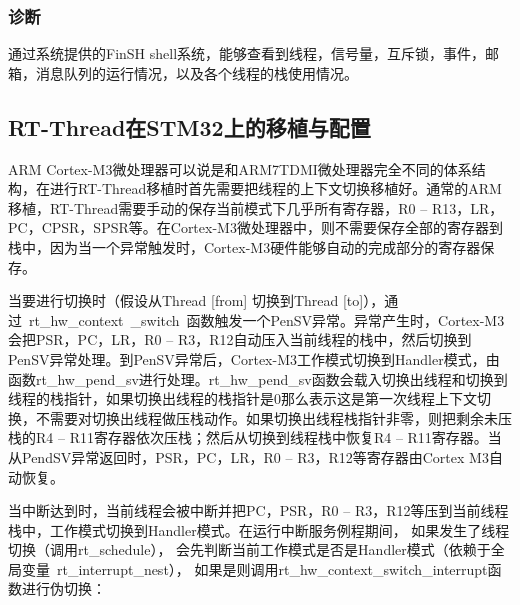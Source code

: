 \subsubsection{诊断}
通{\cf}过系{\cf}统提{\cf}供的{\cf}Fi{\cf}nS{\cf}H {\cf}sh{\cf}el{\cf}l系{\cf}统，{\cf}能够{\cf}查看{\cf}到线{\cf}程，{\cf}信号{\cf}量，{\cf}互斥{\cf}锁，{\cf}事件{\cf}，邮{\cf}箱，{\cf}消息{\cf}队列{\cf}的运{\cf}行情{\cf}况，{\cf}以及{\cf}各个{\cf}线程{\cf}的栈{\cf}使用{\cf}情况。

\subsection{RT-Thread在STM32上的移植与配置}
ARM{\reg} Cortex{\reg}-M3微{\cf}处理{\cf}器可{\cf}以说{\cf}是和{\cf}AR{\cf}M7{\cf}TD{\cf}MI{\cf}微处{\cf}理器{\cf}完全{\cf}不同{\cf}的体{\cf}系结{\cf}构，{\cf}在进{\cf}行R{\cf}T-{\cf}Th{\cf}re{\cf}ad{\cf}移植{\cf}时首{\cf}先需{\cf}要把{\cf}线程{\cf}的上{\cf}下文{\cf}切换{\cf}移植好。通常的ARM\newpage{}\noindent{}移植，RT-Thread需要手动的保存当前模式下几乎所有寄存器，R0 – R13，LR，PC，CPSR，SPSR等。在Cortex{\reg}-M3微处理器中，则不需要保存全部的寄存器到栈中，因为当一个异常触发时，Cortex{\reg}-M3硬件能够自动的完成部分的寄存器保存。

当要进行切换时（假设从Thread [from] 切换到Thread [to]），通过~rt{\_}hw{\_}context~{\_}switch~函数触发一个PenSV异常。异常产生时，Cortex{\reg}-M3会把PSR，PC，LR，R0 – R3，R12自动压入当前线程的栈中，然后切换到PenSV异常处理。到PenSV异常后，Cortex{\reg}-M3工作模式切换到Handler模式，由函数rt{\_}hw{\_}pend{\_}sv进行处理。rt{\_}hw{\_}pend{\_}sv函{\cf}数会{\cf}载入{\cf}切换{\cf}出线{\cf}程和{\cf}切换{\cf}到线{\cf}程的{\cf}栈指{\cf}针，{\cf}如果{\cf}切换{\cf}出线{\cf}程的{\cf}栈指{\cf}针是{\cf}0那{\cf}么表{\cf}示这{\cf}是第{\cf}一次{\cf}线程{\cf}上下{\cf}文切{\cf}换，{\cf}不需{\cf}要对{\cf}切换{\cf}出线{\cf}程做{\cf}压栈{\cf}动作{\cf}。如{\cf}果切{\cf}换出{\cf}线程{\cf}栈指{\cf}针非{\cf}零，{\cf}则把{\cf}剩余{\cf}未压{\cf}栈的{\cf}R4{\cf} –{\cf} R{\cf}11{\cf}寄存{\cf}器依{\cf}次压{\cf}栈；{\cf}然后{\cf}从切{\cf}换到{\cf}线程{\cf}栈中{\cf}恢复{\cf}R4{\cf} –{\cf} R{\cf}11{\cf}寄存{\cf}器。{\cf}当从{\cf}Pe{\cf}nd{\cf}SV{\cf}异常{\cf}返回{\cf}时，{\cf}PS{\cf}R，{\cf}PC{\cf}，L{\cf}R，{\cf}R0{\cf} –{\cf} R{\cf}3，{\cf}R1{\cf}2等{\cf}寄存{\cf}器由Cortex{\reg} M3自动恢复。

当{\cf}中断{\cf}达到{\cf}时，{\cf}当前{\cf}线程{\cf}会被{\cf}中断{\cf}并把{\cf}PC{\cf}，P{\cf}SR{\cf}，R{\cf}0 {\cf}– {\cf}R3{\cf}，R{\cf}12{\cf}等压{\cf}到当{\cf}前线{\cf}程栈{\cf}中，{\cf}工作{\cf}模式{\cf}切换{\cf}到H{\cf}an{\cf}dl{\cf}er{\cf}模式{\cf}。在{\cf}运行{\cf}中断{\cf}服务{\cf}例程{\cf}期间{\cf}， {\cf}如果{\cf}发生{\cf}了线{\cf}程切换（调用rt{\_}schedule）， 会先{\cf}判断{\cf}当前{\cf}工作{\cf}模式{\cf}是否{\cf}是H{\cf}an{\cf}dl{\cf}er{\cf}模式{\cf}（依{\cf}赖于{\cf}全局{\cf}变量~rt{\_}interrupt{\_}nest）， 如{\cf}果是{\cf}则调{\cf}用rt{\_}hw{\_}context{\_}switch{\_}interrupt函数进行伪切换：

